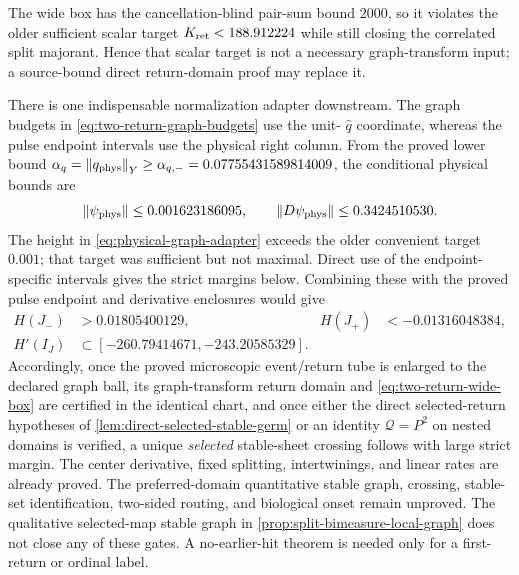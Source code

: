 The wide box has the cancellation-blind pair-sum bound \(2000\), so it
violates the older sufficient scalar target \(K_{\rm ret}<188.912224\) while
still closing the correlated split majorant.  Hence that scalar target is not
a necessary graph-transform input; a source-bound direct return-domain proof
may replace it.

There is one indispensable normalization adapter downstream.  The graph
budgets in \cref{eq:two-return-graph-budgets} use the unit-
\(\widehat q\) coordinate, whereas the pulse endpoint intervals use the
physical right column.  From the proved lower bound
\(\alpha_q=\left\lVert q_{\rm phys}\right\rVert_Y\ge
\alpha_{q,-}=0.07755431589814009\), the conditional
physical bounds are
\begin{equation}
 \left\lVert\psi_{\rm phys}\right\rVert\le0.001623186095,\qquad
 \left\lVert D\psi_{\rm phys}\right\rVert\le0.3424510530.              \label{eq:physical-graph-adapter}
\end{equation}
The height in \cref{eq:physical-graph-adapter} exceeds the older convenient
target \(0.001\); that target was sufficient but not maximal.  Direct use of
the endpoint-specific intervals gives the strict margins below.
Combining these with the proved pulse endpoint and derivative enclosures
would give
\begin{equation}
 \begin{aligned}
 H(J_-)&>0.01805400129,&
 H(J_+)&<-0.01316048384,\\
 H'(I_J)&\subset[-260.79414671,-243.20585329].
 \end{aligned}                                        \label{eq:wide-box-conditional-crossing}
\end{equation}
Accordingly, once the proved microscopic event/return tube is enlarged to the
declared graph ball, its graph-transform return domain and
\cref{eq:two-return-wide-box} are certified in the identical chart, and once
either the direct selected-return hypotheses of
\cref{lem:direct-selected-stable-germ} or an identity \(\mathcal Q=P^2\) on
nested domains is verified, a unique \emph{selected} stable-sheet crossing
follows with large strict margin.  The center derivative, fixed splitting,
intertwinings, and linear rates are already proved.  The preferred-domain
quantitative stable graph, crossing, stable-set identification, two-sided
routing, and biological onset remain unproved.  The qualitative selected-map
stable graph in \cref{prop:split-bimeasure-local-graph} does not close any of
these gates.  A no-earlier-hit theorem is needed only for a first-return or
ordinal label.

